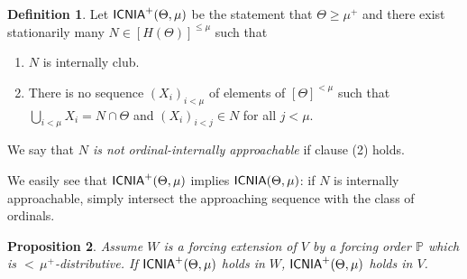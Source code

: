 \documentclass[a4paper]{amsart}
\theoremstyle{definition}
\newtheorem{mydef}{Definition}[section]
\theoremstyle{remark}
\theoremstyle{plain}
\newtheorem{mypro}[mydef]{Proposition}
\numberwithin{mydef}{section}
\DeclareMathOperator{\ICNIA}{\textup{\textsf{ICNIA}}}
\newcommand{\dP}{\mathbb{P}}
\begin{document}
	
	\begin{mydef}\label{plus-version}
		Let $\ICNIA^+(\Theta,\mu)$ be the statement that $\Theta\geq\mu^+$ and there exist stationarily many $N\in[H(\Theta)]^{\leq\mu}$ such that
		\begin{enumerate}
			\item $N$ is internally club.
			\item There is no sequence $(X_i)_{i<\mu}$ of elements of $[\Theta]^{<\mu}$ such that $\bigcup_{i<\mu}X_i=N\cap \Theta$ and $(X_i)_{i<j}\in N$ for all $j<\mu$.
		\end{enumerate}
		
		 We say that \emph{$N$ is not ordinal-internally approachable} if clause (2) holds.
	\end{mydef}
	
	We easily see that $\ICNIA^+(\Theta,\mu)$ implies $\ICNIA(\Theta,\mu)$: if $N$ is internally approachable, simply intersect the approaching sequence with the class of ordinals.
	
	\begin{mypro}\label{ClubApprDown}
		Assume $W$ is a forcing extension of $V$ by a forcing order $\dP$ which is ${<}\,\mu^+$-distributive. If $\ICNIA^+(\Theta,\mu)$ holds in $W$, $\ICNIA^+(\Theta,\mu)$ holds in $V$.
	\end{mypro}
	
\end{document}
